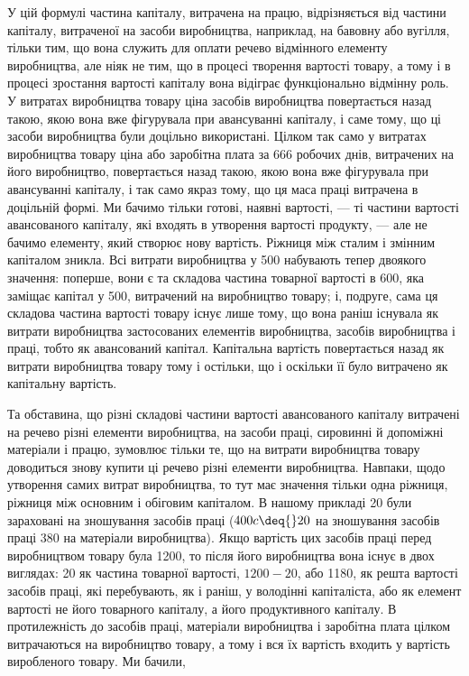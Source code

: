 
У цій формулі частина капіталу, витрачена на працю, відрізняється
від частини капіталу, витраченої на засоби виробництва,
наприклад, на бавовну або вугілля, тільки тим, що вона
служить для оплати речево відмінного елементу виробництва,
але ніяк не тим, що в процесі творення вартості товару, а тому
і в процесі зростання вартості капіталу вона відіграє функціонально
відмінну роль. У витратах виробництва товару ціна засобів
виробництва повертається назад такою, якою вона вже
фігурувала при авансуванні капіталу, і саме тому, що ці засоби
виробництва були доцільно використані. Цілком так само у витратах
виробництва товару ціна або заробітна плата за 666
робочих днів, витрачених на його виробництво, повертається
назад такою, якою вона вже фігурувала при авансуванні капіталу,
і так само якраз тому, що ця маса праці витрачена в доцільній
формі. Ми бачимо тільки готові, наявні вартості, — ті
частини вартості авансованого капіталу, які входять в утворення
вартості продукту, — але не бачимо елементу, який створює
нову вартість. Ріжниця між сталим і змінним капіталом зникла.
Всі витрати виробництва у 500 набувають
тепер двоякого значення: поперше, вони є та складова частина
товарної вартості в 600, яка заміщає капітал
у 500, витрачений на виробництво товару;
і, подруге, сама ця складова частина вартості товару існує лише
тому, що вона раніш існувала як витрати виробництва застосованих
елементів виробництва, засобів виробництва і праці, тобто
як авансований капітал. Капітальна вартість повертається назад
як витрати виробництва товару тому і остільки, що і оскільки
її було витрачено як капітальну вартість.

Та обставина, що різні складові частини вартості авансованого
капіталу витрачені на речево різні елементи виробництва,
на засоби праці, сировинні й допоміжні матеріали і працю,
зумовлює тільки те, що на витрати виробництва товару доводиться
знову купити ці речево різні елементи виробництва.
Навпаки, щодо утворення самих витрат виробництва, то тут має
значення тільки одна ріжниця, ріжниця між основним і обіговим
капіталом. В нашому прикладі 20 були зараховані
на зношування засобів праці ($400 c \deq{} 20$
на зношування засобів праці \dplus{} 380 на
матеріали виробництва). Якщо вартість цих засобів праці перед
виробництвом товару була \deq{} 1200, то після
його виробництва вона існує в двох виглядах: 20
як частина товарної вартості, $1200-20$, або 1180,
як решта вартості засобів праці, які перебувають, як і раніш,
у володінні капіталіста, або як елемент вартості не його
товарного капіталу, а його продуктивного капіталу. В протилежність
до засобів праці, матеріали виробництва і заробітна плата
цілком витрачаються на виробництво товару, а тому і вся їх
вартість входить у вартість виробленого товару. Ми бачили,
\parbreak{}  %
